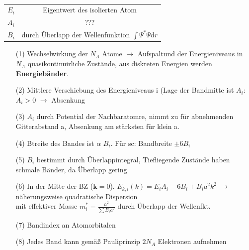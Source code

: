 \begin{itemize}
\begin{itemize}
\begin{align*}
        \end{align*}
        \begin{table}[H]
            \begin{tabular}{cc}
                $E_i$ & Eigentwert des isolierten Atom\\
                $A_i$ & ??? \\
                $B_i$ & durch Überlapp der Wellenfunktion $\int \Psi^* \Psi \mathrm{d}r$
            \end{tabular}
        \end{table}
        \begin{itemize}
            \item[(1)] Wechselwirkung der  $N_A$ Atome $\rightarrow$ Aufspaltund der Energieniveaus in $N_A$ quasikontinuirliche Zustände, aus diskreten Energien werden \textbf{Energiebänder}.
            \item[(2)] Mittlere Verschiebung des Energieniveaus i (Lage der Bandmitte ist $A_i$: $A_i > 0$ $\rightarrow$ Absenkung
            \item[(3)] $A_i$ durch Potential der Nachbaratomre, nimmt zu für abnehmenden Gitterabstand a, Absenkung am stärksten für klein a.
            \item[(4)] Btreite des Bandes ist $\alpha$ $B_i$. Für sc: Bandbreite $\pm 6 B_i$
            \item[(5)] $B_i$ bestimmt durch Überlappintegral, Tiefliegende Zustände haben schmale Bänder, da Überlapp gering
            \item[(6)] In der Mitte der BZ ($\textbf{k} = 0$). $E_{k,i} (k) = E_i A_i - 6 B_i + B_i a^2k^2$
            $\rightarrow$ näherungsweise quadratische Dispersion\\
            mit effektiver Masse $m_i^* = \frac{\hbar^2}{\sum B_i a^2}$ durch Überlapp der Wellenfkt.
            \item[(7)] Bandindex an Atomorbitalen
            \item[(8)] Jedes Band kann gemäß Pauliprinzip $2N_A$ Elektronen aufnehmen 
        \end{itemize}
    \end{itemize}
\end{itemize}